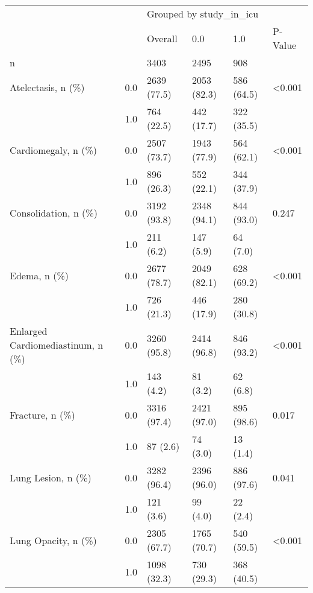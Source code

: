 \begin{tabular}{llllll}
\toprule
                       &     & \multicolumn{4}{l}{Grouped by study\_in\_icu} \\
                       &     &                 Overall &          0.0 &         1.0 & P-Value \\
\midrule
n & {} &                    3403 &         2495 &         908 &         \\
Atelectasis, n (\%) & 0.0 &             2639 (77.5) &  2053 (82.3) &  586 (64.5) &  <0.001 \\
                       & 1.0 &              764 (22.5) &   442 (17.7) &  322 (35.5) &         \\
Cardiomegaly, n (\%) & 0.0 &             2507 (73.7) &  1943 (77.9) &  564 (62.1) &  <0.001 \\
                       & 1.0 &              896 (26.3) &   552 (22.1) &  344 (37.9) &         \\
Consolidation, n (\%) & 0.0 &             3192 (93.8) &  2348 (94.1) &  844 (93.0) &   0.247 \\
                       & 1.0 &               211 (6.2) &    147 (5.9) &    64 (7.0) &         \\
Edema, n (\%) & 0.0 &             2677 (78.7) &  2049 (82.1) &  628 (69.2) &  <0.001 \\
                       & 1.0 &              726 (21.3) &   446 (17.9) &  280 (30.8) &         \\
Enlarged Cardiomediastinum, n (\%) & 0.0 &             3260 (95.8) &  2414 (96.8) &  846 (93.2) &  <0.001 \\
                       & 1.0 &               143 (4.2) &     81 (3.2) &    62 (6.8) &         \\
Fracture, n (\%) & 0.0 &             3316 (97.4) &  2421 (97.0) &  895 (98.6) &   0.017 \\
                       & 1.0 &                87 (2.6) &     74 (3.0) &    13 (1.4) &         \\
Lung Lesion, n (\%) & 0.0 &             3282 (96.4) &  2396 (96.0) &  886 (97.6) &   0.041 \\
                       & 1.0 &               121 (3.6) &     99 (4.0) &    22 (2.4) &         \\
Lung Opacity, n (\%) & 0.0 &             2305 (67.7) &  1765 (70.7) &  540 (59.5) &  <0.001 \\
                       & 1.0 &             1098 (32.3) &   730 (29.3) &  368 (40.5) &         \\

\end{tabular}
